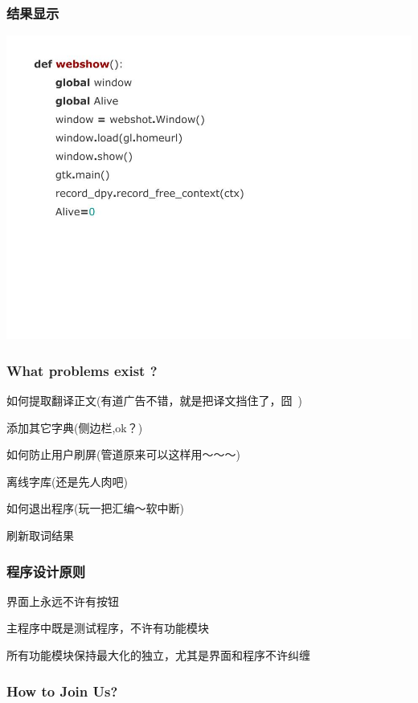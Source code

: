 \documentclass[10pt]{beamer}
\begin{document}
\begin{CJK*}{UTF8}{song}
\begin{frame}
   \frametitle{结果显示}
   \includegraphics[width=1.0\textwidth]{result.jpg}
\end{frame}

\begin{frame}
  \frametitle{\Large{What problems exist ?}}
\begin{itemize}
{ 
  \item 如何提取翻译正文(有道广告不错，就是把译文挡住了，囧~) 
  \item 添加其它字典(侧边栏,ok？)
  \item 如何防止用户刷屏(管道原来可以这样用～～～)
  \item 离线字库(还是先人肉吧)
  \item 如何退出程序(玩一把汇编～软中断) 
  \item 刷新取词结果
}
\end{itemize}
\end{frame}

\begin{frame}
   \frametitle{程序设计原则}
\Large\begin{itemize}
 {\item 界面上永远不许有按钮
  \item 主程序中既是测试程序，不许有功能模块
  \item 所有功能模块保持最大化的独立，尤其是界面和程序不许纠缠
 }
\end{itemize}
\end{frame}
\begin{frame}
  \frametitle{How to Join Us?}


\end{frame}
\end{CJK*}
\end{document}
